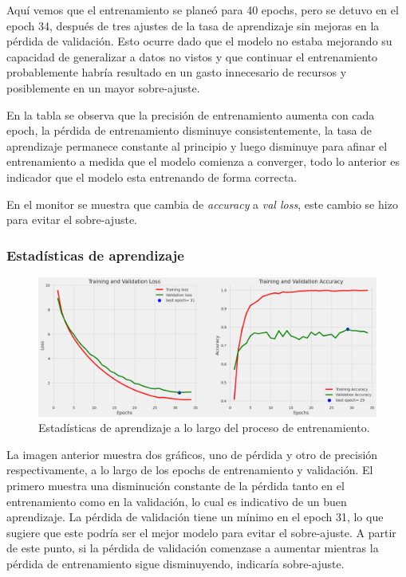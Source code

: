   Aquí vemos que el entrenamiento se planeó para 40 epochs, pero se detuvo en el epoch 34, después de tres ajustes de la tasa de aprendizaje sin mejoras en la pérdida de validación. Esto ocurre dado que el modelo no estaba mejorando su capacidad de generalizar a datos no vistos y que continuar el entrenamiento probablemente habría resultado en un gasto innecesario de recursos y posiblemente en un mayor sobre-ajuste. 
  
  En la tabla se observa que la precisión de entrenamiento aumenta con cada epoch, la pérdida de entrenamiento disminuye consistentemente, la tasa de aprendizaje permanece constante al principio y luego disminuye para afinar el entrenamiento a medida que el modelo comienza a converger, todo lo anterior es indicador que el modelo esta entrenando de forma correcta.

  En el monitor se muestra que cambia de \textit{accuracy} a \textit{val loss}, este cambio se hizo para evitar el sobre-ajuste.

\subsubsection{Estadísticas de aprendizaje}\label{sub:learning_statistics_p1}
		\begin{figure}[ht]%
      \begin{center}
      \includegraphics[width=1\textwidth]{./Graphics/training&validation_p1.png}
      \caption{Estadísticas de aprendizaje a lo largo del proceso de entrenamiento.\label{fig:training_validation_loss}}
      \end{center}
		\end{figure}
  
La imagen anterior muestra dos gráficos, uno de pérdida y otro de precisión respectivamente, a lo largo de los epochs de entrenamiento y validación. El primero muestra una disminución constante de la pérdida tanto en el entrenamiento como en la validación, lo cual es indicativo de un buen aprendizaje. La pérdida de validación tiene un mínimo en el epoch 31, lo que sugiere que este podría ser el mejor modelo para evitar el sobre-ajuste. A partir de este punto, si la pérdida de validación comenzase a aumentar mientras la pérdida de entrenamiento sigue disminuyendo, indicaría sobre-ajuste.

